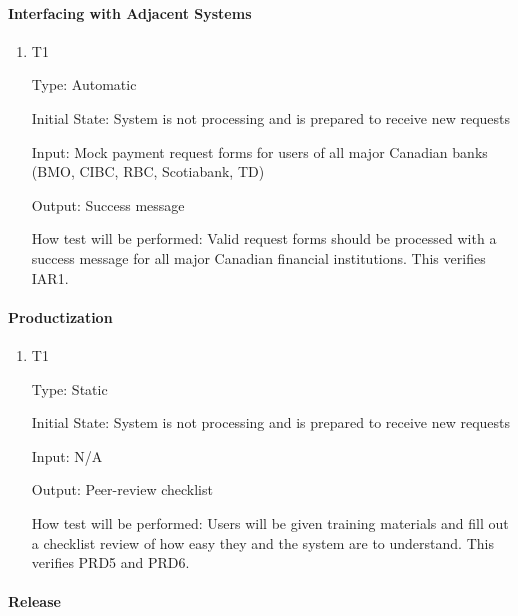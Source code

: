 \documentclass[12pt, titlepage]{article}
\begin{document}
\paragraph{Interfacing with Adjacent Systems}

\begin{enumerate}

\item{T1\\}
\hypertarget{NFR13.3-TC1}{}

Type: Automatic

Initial State: System is not processing and is prepared to receive new requests

Input: Mock payment request forms for users of all major Canadian banks (BMO, CIBC, RBC, Scotiabank, TD)

Output: Success message

How test will be performed: Valid request forms should be processed with a success message for all major Canadian financial institutions. This verifies IAR1.

\end{enumerate}

\paragraph{Productization}

\begin{enumerate}

\item{T1\\}
\hypertarget{NFR13.4-TC1}{} 

Type: Static 

Initial State: System is not processing and is prepared to receive new requests

Input: N/A

Output: Peer-review checklist

How test will be performed: Users will be given training materials and fill out a checklist review of how easy they and the system are to understand. This verifies PRD5 and PRD6.

\end{enumerate}

\paragraph{Release}
\end{document}
